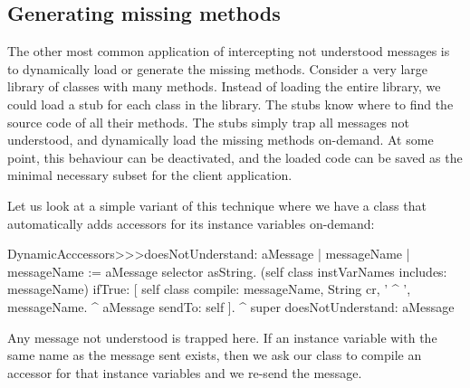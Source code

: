 \documentclass[a4paper,10pt,twoside]{book}
\begin{document}
\subsection{Generating missing methods}

The other most common application of intercepting not understood messages is to dynamically load or generate the missing methods.
Consider a very large library of classes with many methods.  Instead of loading the entire library, we could load a stub for each class in the library. The stubs know where to find the source code of all their methods.  The stubs simply trap all messages not understood, and dynamically load the missing methods on-demand.  At some point, this behaviour can be deactivated, and the loaded code can be saved as the minimal necessary subset for the client application.


Let us look at a simple variant of this technique where we have a class that automatically adds accessors for its instance variables on-demand:

\begin{code}{}
DynamicAcccessors>>>doesNotUnderstand: aMessage
        | messageName |
        messageName := aMessage selector asString.
        (self class instVarNames includes: messageName)
                ifTrue: [
                        self class compile: messageName, String cr, ' ^ ', messageName.
                        ^ aMessage sendTo: self ].
        ^ super doesNotUnderstand: aMessage
\end{code}
Any message not understood is trapped here. If an instance variable with the same name as the message sent exists, then we ask our class to compile an accessor for that instance variables and we re-send the message.
\end{document}
